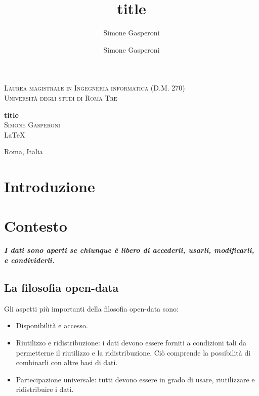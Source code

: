 \documentclass{article}
\author{Simone Gasperoni}
\author{Simone Gasperoni}
\title{title}
\theoremstyle{plain}
\theoremstyle{definition}
\begin{document}
\begin{titlepage}
\begin{center}

\textsc{Laurea magistrale in Ingegneria informatica (D.M. 270)}\\[0.5cm]
\textsc{Università degli studi di Roma Tre}\\[0.5cm]

\hrulefill

{ \huge \bfseries title \\[0.4cm] }
\textsc{\Large Simone Gasperoni}\\[0.5cm]
\vfill
\LaTeX


Roma, Italia
\end{center}
\end{titlepage}


\tableofcontents

\newpage
\section{Introduzione}

\newpage
\section{Contesto}
\textbf{\textit{I dati sono aperti se chiunque è libero di accederli, usarli, modificarli, e condividerli.}}
\footnotemark
{}

\subsection{La filosofia open-data}

Gli aspetti più importanti della filosofia open-data sono:
\begin{itemize}
\item Disponibilità e accesso.
\item Riutilizzo e ridistribuzione: i dati devono essere forniti a condizioni tali da permetterne il riutilizzo e la ridistribuzione. Ciò comprende la possibilità di combinarli con altre basi di dati.
\item Partecipazione universale: tutti devono essere in grado di usare, riutilizzare e ridistribuire i dati.
\end{itemize}
\end{document}
